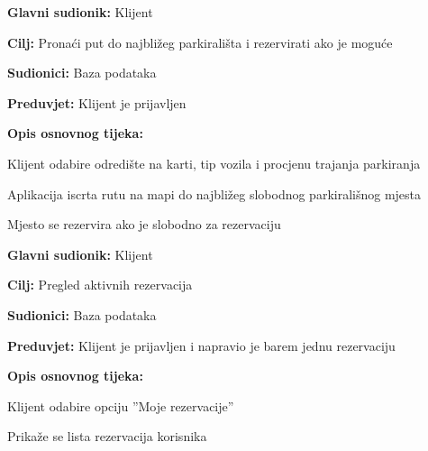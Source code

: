 \noindent {}
\begin{packed_item}
	
	\item \textbf{Glavni sudionik: }Klijent
	\item  \textbf{Cilj:} Pronaći put do najbližeg parkirališta i rezervirati ako je moguće
	\item  \textbf{Sudionici:} Baza podataka
	\item  \textbf{Preduvjet:} Klijent je prijavljen
	\item  \textbf{Opis osnovnog tijeka:}
	
	\item[] \begin{packed_enum}
		
		\item Klijent odabire odredište na karti, tip vozila i procjenu trajanja parkiranja
		\item Aplikacija iscrta rutu na mapi do najbližeg slobodnog parkirališnog mjesta
		\item Mjesto se rezervira ako je slobodno za rezervaciju
		
	\end{packed_enum}
\end{packed_item}

\noindent {}
\begin{packed_item}
	
	\item \textbf{Glavni sudionik: }Klijent
	\item  \textbf{Cilj:} Pregled aktivnih rezervacija
	\item  \textbf{Sudionici:} Baza podataka
	\item  \textbf{Preduvjet:} Klijent je prijavljen i napravio je barem jednu rezervaciju
	\item  \textbf{Opis osnovnog tijeka:}
	
	\item[] \begin{packed_enum}
		
		\item Klijent odabire opciju ”Moje rezervacije”
		\item Prikaže se lista rezervacija korisnika
		
	\end{packed_enum}
\end{packed_item}

